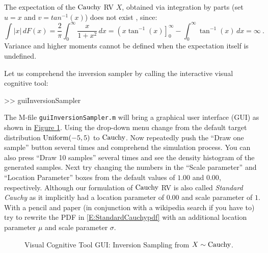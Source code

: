 \begin{example}
The expectation of the $\mbox{{\rm Cauchy}}$ RV $X$, obtained via integration by parts (set $u=x$ and $v=tan^{-1}(x)$) does not exist  %
, since:
\begin{equation}\label{E:CauchyMeanDoesNotExist}
\int \left|x\right|\,dF(x) = \frac{2}{\pi} \int_0^{\infty} \frac{x}{1+x^2}\,dx = \left(x \tan^{-1}(x) \right]_0^{\infty} - \int_0^{\infty} \tan^{-1}(x)\, dx = \infty \ .
\end{equation}
Variance and higher moments cannot be defined when the expectation itself is undefined.
\end{example}

\begin{labwork}\label{LW:guiInversionSamplerCauchy}
Let us comprehend the inversion sampler by calling the interactive visual cognitive tool:
\begin{VrbM}
>> guiInversionSampler
\end{VrbM}
The M-file {\tt guiInversionSampler.m} will bring a graphical user interface (GUI) as shown in \hyperref[F:guiInversionSamplerCauchy]{Figure \ref*{F:guiInversionSamplerCauchy}}.  Using the drop-down menu change from the default target distribution $\mbox{{\rm Uniform}}(-5,5)$ to $\mbox{{\rm Cauchy}}$.  Now repeatedly push the ``Draw one sample'' button several times and comprehend the simulation process.  You can also press ``Draw 10 samples'' several times and see the density histogram of the generated samples.  
Next try changing the numbers in the ``Scale parameter'' and ``Location Parameter'' boxes from the default values of $1.00$ and  $0.00$, respectively.  Although our formulation of $\mbox{{\rm Cauchy}}$ RV is also called {\em Standard Cauchy} as it implicitly had a location parameter of $0.00$ and scale parameter of $1$.  With a pencil and paper (in conjunction with a wikipedia search if you have to) try to rewrite the PDF in \eqref{E:StandardCauchypdf} with an additional location parameter $\mu$ and scale parameter $\sigma$.
\end{labwork}

\begin{figure}[htpb]
\caption{Visual Cognitive Tool GUI: Inversion Sampling from $X \sim \mbox{{\rm Cauchy}}$.\label{F:guiInversionSamplerCauchy}}
\centering   {}
\end{figure}

